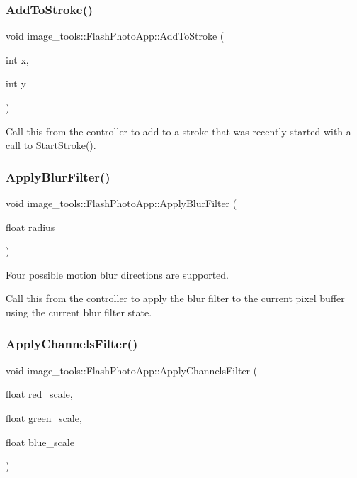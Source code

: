 \subsubsection{\texorpdfstring{Add\+To\+Stroke()}{AddToStroke()}}
{\footnotesize\ttfamily void image\+\_\+tools\+::\+Flash\+Photo\+App\+::\+Add\+To\+Stroke (\begin{DoxyParamCaption}\item[{int}]{x,  }\item[{int}]{y }\end{DoxyParamCaption})}

Call this from the controller to add to a stroke that was recently started with a call to \hyperlink{classimage__tools_1_1FlashPhotoApp_ab40b6ecc2ba4caa35b8e18f091b67253}{Start\+Stroke()}. \mbox{\label{classimage__tools_1_1FlashPhotoApp_ab9de628d295f2ce1ea869767cb918a2d}} 
\subsubsection{\texorpdfstring{Apply\+Blur\+Filter()}{ApplyBlurFilter()}}
{\footnotesize\ttfamily void image\+\_\+tools\+::\+Flash\+Photo\+App\+::\+Apply\+Blur\+Filter (\begin{DoxyParamCaption}\item[{float}]{radius }\end{DoxyParamCaption})}



Four possible motion blur directions are supported. 

Call this from the controller to apply the blur filter to the current pixel buffer using the current blur filter state. \mbox{\label{classimage__tools_1_1FlashPhotoApp_a4560186e719150bcecc0b665a48bb1d2}} 
\subsubsection{\texorpdfstring{Apply\+Channels\+Filter()}{ApplyChannelsFilter()}}
{\footnotesize\ttfamily void image\+\_\+tools\+::\+Flash\+Photo\+App\+::\+Apply\+Channels\+Filter (\begin{DoxyParamCaption}\item[{float}]{red\+\_\+scale,  }\item[{float}]{green\+\_\+scale,  }\item[{float}]{blue\+\_\+scale }\end{DoxyParamCaption})}

